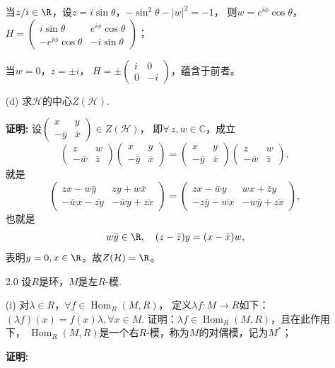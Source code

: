 \begin{enumerate}
        当$z/i\in\R$，设$z=i\sin\theta$，$-\sin^2\theta-|w|^2=-1$，
        则$w=e^{i\phi}\cos\theta$，
        $H=\begin{pmatrix}i\sin\theta&e^{i\phi}\cos\theta\\
        -e^{i\phi}\cos\theta&-i\sin\theta\end{pmatrix}$；

        当$w=0$，$z=\pm i$，
        $H=\pm\begin{pmatrix}i&0\\0&-i\end{pmatrix}$，蕴含于前者。

    \item[(d)]求$\mathcal{H}$的中心$Z(\mathcal{H})$.
    \item[\textbf{证明:}]
        设$\begin{pmatrix}x&y\\-\bar{y}&\bar{x}\end{pmatrix}\in Z(\mathcal{H})$，
        即$\forall\,z,w\in\mathbb{C}$，成立
        $$\begin{pmatrix}z&w\\-\bar{w}&\bar{z}\end{pmatrix}
        \begin{pmatrix}x&y\\-\bar{y}&\bar{x}\end{pmatrix}
        =\begin{pmatrix}x&y\\-\bar{y}&\bar{x}\end{pmatrix}
        \begin{pmatrix}z&w\\-\bar{w}&\bar{z}\end{pmatrix},$$
        就是
        $$\begin{pmatrix}zx-w\bar{y}&zy+w\bar{x}\\
        -\bar{w}x-\overline{zy}&-\bar{w}y+\overline{zx}\end{pmatrix}
        =\begin{pmatrix}zx-\bar{w}y&wx+\bar{z}y\\
        -z\bar{y}-\overline{wx}&-w\bar{y}+\overline{zx}\end{pmatrix},$$
        也就是
        $$w\bar{y}\in\R,\quad (z-\bar{z})y=(x-\bar{x})w,$$
        表明$y=0,x\in\R$。故$Z(\mathcal{H})=\R$。
        
    \item[2.0]
        设$R$是环，$M$是左$R$-模.
    \item[(i)]对$\lambda\in R$，$\forall f\in\operatorname{Hom}_R(M,R)$，
        定义$\lambda f\colon M\rightarrow R$如下：
        $(\lambda f)(x)=f(x)\lambda, \forall x\in M$. 
        证明：$\lambda f\in\operatorname{Hom}_R(M,R)$，且在此作用下，
        $\operatorname{Hom}_R(M,R)$是一个右$R$-模，称为$M$的对偶模，记为$M^*$；
    \item[\textbf{证明:}]


\end{enumerate}
